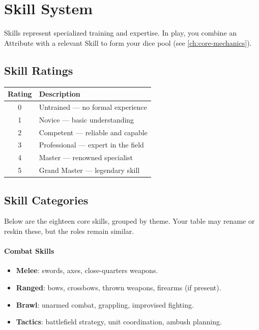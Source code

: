 \newpage
\section{Skill System}
\label{sec:skills}

Skills represent specialized training and expertise. In play, you combine an
Attribute with a relevant Skill to form your dice pool (see \ref{ch:core-mechanics}).

\subsection{Skill Ratings}
\label{sec:skill-ratings}
\begin{center}
\begin{tabular}{cl}
\toprule
\textbf{Rating} & \textbf{Description} \\
\midrule
0 & Untrained --- no formal experience \\
1 & Novice --- basic understanding \\
2 & Competent --- reliable and capable \\
3 & Professional --- expert in the field \\
4 & Master --- renowned specialist \\
5 & Grand Master --- legendary skill \\
\bottomrule
\end{tabular}
\end{center}

\subsection{Skill Categories}
\label{sec:skill-categories}
Below are the eighteen core skills, grouped by theme. Your table may rename or reskin
these, but the roles remain similar.

\paragraph{Combat Skills}
\begin{itemize}
  \item \textbf{Melee}: swords, axes, close-quarters weapons.
  \item \textbf{Ranged}: bows, crossbows, thrown weapons, firearms (if present).
  \item \textbf{Brawl}: unarmed combat, grappling, improvised fighting.
  \item \textbf{Tactics}: battlefield strategy, unit coordination, ambush planning.
\end{itemize}

